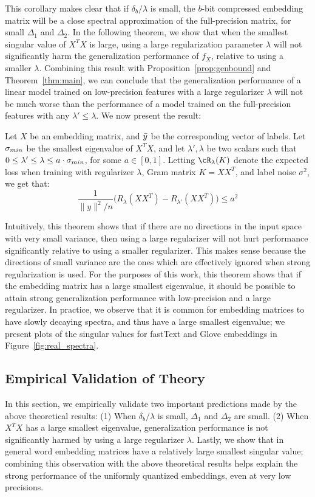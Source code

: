 This corollary makes clear that if $\delta_b/\lambda$ is small, the $b$-bit compressed embedding matrix will be a close spectral approximation of the full-precision matrix, for small $\Delta_1$ and $\Delta_2$.
In the following theorem, we show that when the smallest singular value of $X^TX$ is large, using a large regularization parameter $\lambda$ will not significantly harm the generalization performance of $f_X$, relative to using a smaller $\lambda$.
Combining this result with Proposition~\ref{prop:genbound} and Theorem~\ref{thm:main}, we can conclude that the generalization performance of a linear model trained on low-precision features with a large regularizer $\lambda$ will not be much worse than the performance of a model trained on the full-precision features with any $\lambda' \leq \lambda$.
We now present the result:

\begin{theorem}
	\label{thm:large_lambda}
	Let $X$ be an embedding matrix, and $\by$ be the corresponding vector of labels. Let $\sm$ be the smallest eigenvalue of $X^T X$, and let $\lambda', \lambda$ be two scalars such that $0 \leq \lambda' \leq \lambda \leq a\cdot \sm$, for some $a \in [0,1]$. Letting $\cR_{\lambda}(K)$ denote the expected loss when training with regularizer $\lambda$, Gram matrix $K = XX^T$, and label noise $\sigma^2$, we get that:
	\begin{equation}
	\frac{1}{\|y\|^2/n}\Big(R_{\lambda}(XX^T) - R_{\lambda'}(XX^T)\Big) \leq a^2
	\label{eq1}
	\end{equation}
\end{theorem}
Intuitively, this theorem shows that if there are no directions in the input space with very small variance, then using a large regularizer will not hurt performance significantly relative to using a smaller regularizer.
This makes sense because the directions of small variance are the ones which are effectively ignored when strong regularization is used.
For the purposes of this work, this theorem shows that if the embedding matrix has a large smallest eigenvalue, it should be possible to attain strong generalization performance with low-precision and a large regularizer.
In practice, we observe that it is common for embedding matrices to have slowly decaying spectra, and thus have a large smallest eigenvalue;
we present plots of the singular values for fastText and Glove embeddings in Figure~\ref{fig:real_spectra}.

\subsection{Empirical Validation of Theory}
\label{sec:theory_validation}
In this section, we empirically validate two important predictions made by the above theoretical results: (1) When $\delta_b/\lambda$ is small, $\Delta_1$ and $\Delta_2$ are small. (2) When $X^T X$ has a large smallest eigenvalue, generalization performance is not significantly harmed by using a large regularizer $\lambda$.
Lastly, we show that in general word embedding matrices have a relatively large smallest singular value;
combining this observation with the above theoretical results helps explain the strong performance of the uniformly quantized embeddings, even at very low precisions.

